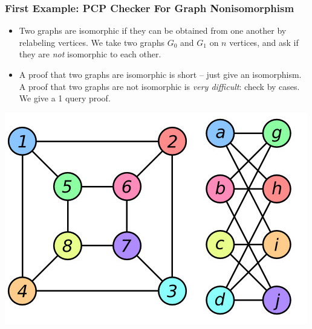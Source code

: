 \documentclass{beamer}
\begin{document}
\begin{frame}
    \frametitle{First Example: PCP Checker For Graph Nonisomorphism}

    \begin{itemize}
        \item<1-> Two graphs are isomorphic if they can be obtained from one another by relabeling vertices. We take two graphs $G_0$ and $G_1$ on $n$ vertices, and ask if they are {\it not} isomorphic to each other.

        \item<2-> A proof that two graphs are isomorphic is short -- just give an isomorphism. A proof that two graphs are not isomorphic is {\it very difficult}: check by cases. We give a 1 query proof.
    \end{itemize}

    \begin{center}
        \includegraphics[scale=0.3]{graphisomorphism.jpg}\\
    \end{center}

\end{frame}
\end{document}
